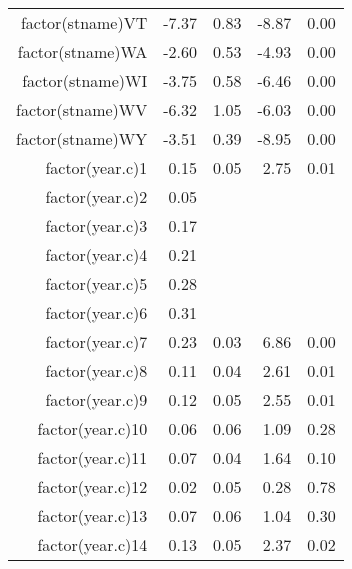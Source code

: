 \begin{table}[ht]
\begin{tabular}{rrrrr}
  factor(stname)VT & -7.37 & 0.83 & -8.87 & 0.00 \\ 
  factor(stname)WA & -2.60 & 0.53 & -4.93 & 0.00 \\ 
  factor(stname)WI & -3.75 & 0.58 & -6.46 & 0.00 \\ 
  factor(stname)WV & -6.32 & 1.05 & -6.03 & 0.00 \\ 
  factor(stname)WY & -3.51 & 0.39 & -8.95 & 0.00 \\ 
  factor(year.c)1 & 0.15 & 0.05 & 2.75 & 0.01 \\ 
  factor(year.c)2 & 0.05 &  &  &  \\ 
  factor(year.c)3 & 0.17 &  &  &  \\ 
  factor(year.c)4 & 0.21 &  &  &  \\ 
  factor(year.c)5 & 0.28 &  &  &  \\ 
  factor(year.c)6 & 0.31 &  &  &  \\ 
  factor(year.c)7 & 0.23 & 0.03 & 6.86 & 0.00 \\ 
  factor(year.c)8 & 0.11 & 0.04 & 2.61 & 0.01 \\ 
  factor(year.c)9 & 0.12 & 0.05 & 2.55 & 0.01 \\ 
  factor(year.c)10 & 0.06 & 0.06 & 1.09 & 0.28 \\ 
  factor(year.c)11 & 0.07 & 0.04 & 1.64 & 0.10 \\ 
  factor(year.c)12 & 0.02 & 0.05 & 0.28 & 0.78 \\ 
  factor(year.c)13 & 0.07 & 0.06 & 1.04 & 0.30 \\ 
  factor(year.c)14 & 0.13 & 0.05 & 2.37 & 0.02 \\ 
   \hline
\end{tabular}
\end{table}
